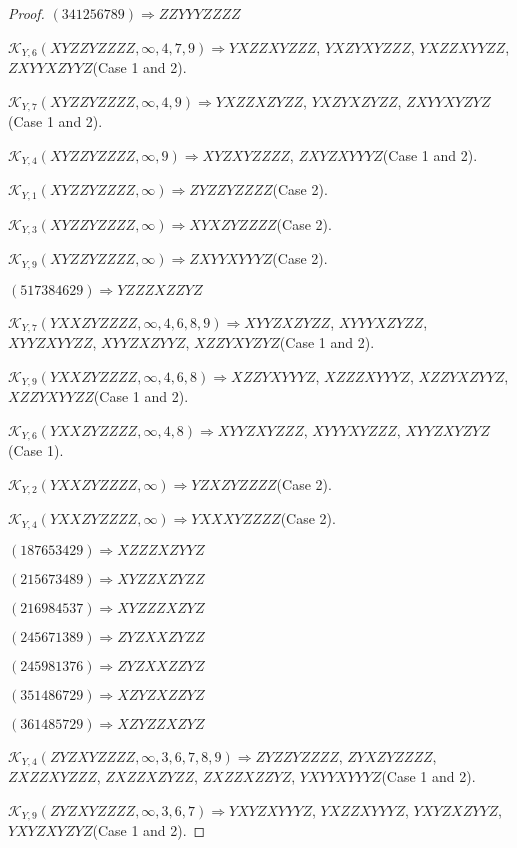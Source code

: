 \documentclass[12pt]{article}
\theoremstyle{plain}
\theoremstyle{definition}
\theoremstyle{remark}
\newcommand{\fancy}[1]{\mathcal{#1}}
\def\K{\fancy{K}}
\begin{document}
\begin{proof}
	$(3 4 1 2 5 6 7 8 9)\Rightarrow ZZYYYZZZZ$
	
	
	
	$\K_{Y,6}(XYZZYZZZZ,\infty,4, 7, 9)\Rightarrow $$YXZZXYZZZ$, $YXZYXYZZZ$, $YXZZXYYZZ$, $ZXYYXZYYZ$(Case 1 and 2).
	
	$\K_{Y,7}(XYZZYZZZZ,\infty,4, 9)\Rightarrow $$YXZZXZYZZ$, $YXZYXZYZZ$, $ZXYYXYZYZ$(Case 1 and 2).
	
	$\K_{Y,4}(XYZZYZZZZ,\infty,9)\Rightarrow $$XYZXYZZZZ$, $ZXYZXYYYZ$(Case 1 and 2).
	
	$\K_{Y,1}(XYZZYZZZZ,\infty)\Rightarrow $$ZYZZYZZZZ$(Case 2).
	
	$\K_{Y,3}(XYZZYZZZZ,\infty)\Rightarrow $$XYXZYZZZZ$(Case 2).
	
	$\K_{Y,9}(XYZZYZZZZ,\infty)\Rightarrow $$ZXYYXYYYZ$(Case 2).
	
	
	
	$(5 1 7 3 8 4 6 2 9)\Rightarrow YZZZXZZYZ$
	
	
	
	$\K_{Y,7}(YXXZYZZZZ,\infty,4, 6, 8, 9)\Rightarrow $$XYYZXZYZZ$, $XYYYXZYZZ$, $XYYZXYYZZ$, $XYYZXZYYZ$, $XZZYXYZYZ$(Case 1 and 2).
	
	$\K_{Y,9}(YXXZYZZZZ,\infty,4, 6, 8)\Rightarrow $$XZZYXYYYZ$, $XZZZXYYYZ$, $XZZYXZYYZ$, $XZZYXYYZZ$(Case 1 and 2).
	
	$\K_{Y,6}(YXXZYZZZZ,\infty,4, 8)\Rightarrow $$XYYZXYZZZ$, $XYYYXYZZZ$, $XYYZXYZYZ$(Case 1).
	
	$\K_{Y,2}(YXXZYZZZZ,\infty)\Rightarrow $$YZXZYZZZZ$(Case 2).
	
	$\K_{Y,4}(YXXZYZZZZ,\infty)\Rightarrow $$YXXXYZZZZ$(Case 2).
	
	
	
	$(1 8 7 6 5 3 4 2 9)\Rightarrow XZZZXZYYZ$
	
	$(2 1 5 6 7 3 4 8 9)\Rightarrow XYZZXZYZZ$
	
	$(2 1 6 9 8 4 5 3 7)\Rightarrow XYZZZXZYZ$
	
	$(2 4 5 6 7 1 3 8 9)\Rightarrow ZYZXXZYZZ$
	
	$(2 4 5 9 8 1 3 7 6)\Rightarrow ZYZXXZZYZ$
	
	$(3 5 1 4 8 6 7 2 9)\Rightarrow XZYZXZZYZ$
	
	$(3 6 1 4 8 5 7 2 9)\Rightarrow XZYZZXZYZ$
	
	
	
	$\K_{Y,4}(ZYZXYZZZZ,\infty,3, 6, 7, 8, 9)\Rightarrow $$ZYZZYZZZZ$, $ZYXZYZZZZ$, $ZXZZXYZZZ$, $ZXZZXZYZZ$, $ZXZZXZZYZ$, $YXYYXYYYZ$(Case 1 and 2).
	
	$\K_{Y,9}(ZYZXYZZZZ,\infty,3, 6, 7)\Rightarrow $$YXYZXYYYZ$, $YXZZXYYYZ$, $YXYZXZYYZ$, $YXYZXYZYZ$(Case 1 and 2).
	

\end{proof}
\end{document}
